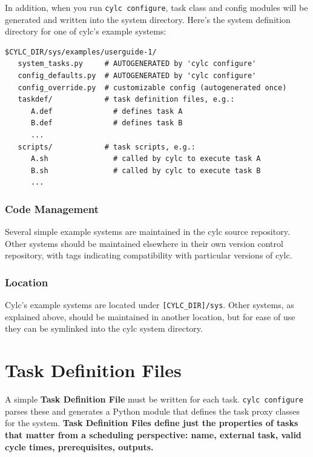 \documentclass[11pt,a4paper]{article}
\begin{document}
In addition, when you run \lstinline{cylc configure}, task class and
config modules will be generated and written into the system directory.
Here's the system definition directory for one of cylc's example
systems: 

\lstset{language=bash}
\begin{lstlisting}
$CYLC_DIR/sys/examples/userguide-1/
   system_tasks.py     # AUTOGENERATED by 'cylc configure' 
   config_defaults.py  # AUTOGENERATED by 'cylc configure' 
   config_override.py  # customizable config (autogenerated once) 
   taskdef/            # task definition files, e.g.:
      A.def              # defines task A
      B.def              # defines task B
      ...
   scripts/            # task scripts, e.g.:
      A.sh               # called by cylc to execute task A
      B.sh               # called by cylc to execute task B
      ...
\end{lstlisting}

\subsubsection{Code Management}

Several simple example systems are maintained in the cylc source
repository.  Other systems should be maintained elsewhere in their
own version control repository, with tags indicating compatibility with
particular versions of cylc.

\subsubsection{Location}

Cylc's example systems are located under \lstinline=[CYLC_DIR]/sys=.
Other systems, as explained above, should be maintained in another
location, but for ease of use they can be symlinked into the cylc system
directory.



\section{Task Definition Files} 
\label{TaskDefinitionFiles}

A simple {\bf Task Definition File} must be written for each task.
\lstinline=cylc configure= parses these and generates a Python module
that defines the task proxy classes for the system. {\bf Task
Definition Files define just the properties of tasks that matter from a
scheduling perspective: name, external task, valid cycle times,
prerequisites, outputs.} 
\end{document}
